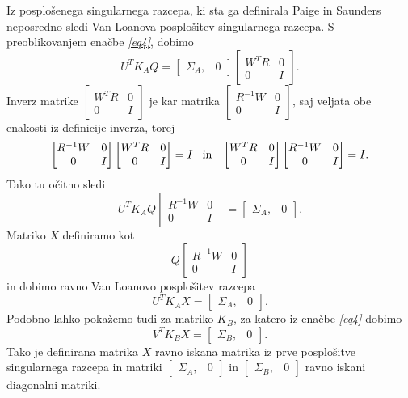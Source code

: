 \documentclass[mat1]{article}
\theoremstyle{definition}
\begin{document}
Iz posplošenega singularnega razcepa, ki sta ga definirala Paige in Saunders neposredno sledi Van Loanova posplošitev singularnega razcepa. 
S preoblikovanjem enačbe \textit{\eqref{eq4}}, dobimo
$$U^T K_A Q = \left[\begin{array}{cc} \Sigma_A, & 0 \end{array}\right]
\begin{bmatrix}
W^TR & 0 \\
0 & I 
\end{bmatrix} \text{.}$$
Inverz matrike
$\begin{bmatrix}
W^TR & 0 \\
0 & I 
\end{bmatrix} $
je kar matrika 
$\begin{bmatrix}
R^{-1} W & 0 \\
0 & I 
\end{bmatrix} \text{,}$
saj veljata obe enakosti iz definicije inverza, torej
$$\begin{bmatrix}
R^{-1} W & 0 \\
0 & I 
\end{bmatrix}
\begin{bmatrix}
W^TR & 0 \\
0 & I 
\end{bmatrix}
= I \hspace{3mm}\text{in} \hspace{3mm}
\begin{bmatrix}
W^TR & 0 \\
0 & I 
\end{bmatrix}
\begin{bmatrix}
R^{-1} W & 0 \\
0 & I 
\end{bmatrix}
= I \text{.}$$
Tako tu očitno sledi
$$ U^T K_A Q
\begin{bmatrix}
R^{-1} W & 0 \\
0 & I 
\end{bmatrix}
=
\left[\begin{array}{cc} \Sigma_A, & 0 \end{array}\right] \text{.}
$$
Matriko $X$ definiramo kot
$$ Q
\begin{bmatrix}
R^{-1} W & 0 \\
0 & I 
\end{bmatrix}
$$ in dobimo ravno Van Loanovo posplošitev razcepa
$$ U^T K_A X = \left[\begin{array}{cc} \Sigma_A, & 0 \end{array}\right] \text{.}
$$
Podobno lahko pokažemo tudi za matriko $K_B$, za katero iz enačbe \textit{\eqref{eq4}} dobimo
$$ V^T K_B X = \left[\begin{array}{cc} \Sigma_B, & 0 \end{array}\right] \text{.}
$$
Tako je definirana matrika $X$ ravno iskana matrika iz prve posplošitve singularnega razcepa in matriki $\left[\begin{array}{cc} \Sigma_A, & 0 \end{array}\right]$ in $\left[\begin{array}{cc} \Sigma_B, & 0 \end{array}\right]$ ravno iskani diagonalni matriki.
\end{document}
